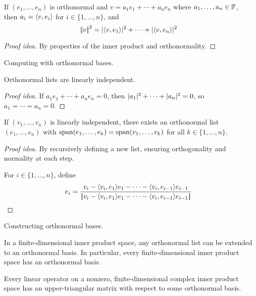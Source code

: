 \begin{thm}
If \((e_1,\ldots,e_n)\) is orthonormal and \(v=a_1e_1+\cdots+a_ne_n\) where \(a_1,\ldots,a_n\in\mathbb{F}\), then \(a_i=\langle{v},{e_i}\rangle\) for \(i\in\{1,\ldots,n\}\), and
\[\left|\!\left|{v}\right|\!\right|^2=|{\langle{v},{e_1}\rangle}|^2+\cdots+|{\langle{v},{e_n}\rangle}|^2\]
\end{thm}
\begin{proof}[Proof idea]
By properties of the inner product and orthonormality.
\end{proof}
\begin{app}
Computing with orthonormal bases.
\end{app}
\begin{cor}
Orthonormal lists are linearly independent.
\end{cor}
\begin{proof}[Proof idea]
If \(a_1e_1+\cdots+a_ne_n=0\), then \(|{a_1}|^2+\cdots+|{a_n}|^2=0\), so \(a_1=\cdots=a_n=0\).
\end{proof}

\begin{thm}
If \((v_1,\ldots,v_n)\) is linearly independent, there exists an orthonormal list \((e_1,\ldots,e_n)\) with \(\operatorname{span}(e_1,\ldots,e_k)=\operatorname{span}(v_1,\ldots,v_k)\) for all \(k\in\{1,\ldots,n\}\).
\end{thm}
\begin{proof}[Proof idea]
By recursively defining a new list, ensuring orthogonality and normality at each step.

For \(i\in\{1,\ldots,n\}\), define
\begin{equation*}
e_i=\frac{v_i-\langle{v_i},{e_1}\rangle e_1-\cdots-\langle{v_i},{e_{i-1}}\rangle e_{i-1}}{\left|\!\left|{v_i-\langle{v_i},{e_1}\rangle e_1-\cdots-\langle{v_i},{e_{i-1}}\rangle e_{i-1}}\right|\!\right|}\qedhere
\end{equation*}
\end{proof}
\begin{app}
Constructing orthonormal bases.
\end{app}
\begin{cor}
In a finite-dimensional inner product space, any orthonormal list can be extended to an orthonormal basis. In particular, every finite-dimensional inner product space has an orthonormal basis.
\end{cor}
\begin{cor}
Every linear operator on a nonzero, finite-dimensional complex inner product space has an upper-triangular matrix with respect to some orthonormal basis.
\end{cor}

